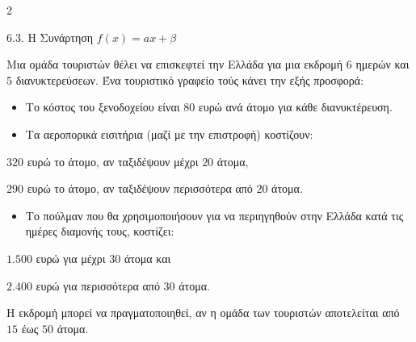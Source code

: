 \begin{ylh}{2}
    \item 6.3. Η Συνάρτηση $f(x)=ax+\beta$
\end{ylh}

Μια ομάδα τουριστών θέλει να επισκεφτεί την Ελλάδα για μια εκδρομή $6$ ημερών και $5$ διανυκτερεύσεων. Ένα τουριστικό γραφείο τούς κάνει την εξής προσφορά:

\begin{itemize}
\item
  Το κόστος του ξενοδοχείου είναι $80$ ευρώ ανά άτομο για κάθε διανυκτέρευση.
\item
  Τα αεροπορικά εισιτήρια (μαζί με την επιστροφή) κοστίζουν:
\end{itemize}

$320$ ευρώ το άτομο, αν ταξιδέψουν μέχρι $20$ άτομα,

$290$ ευρώ το άτομο, αν ταξιδέψουν περισσότερα από $20$ άτομα.

\begin{itemize}
\item
  Το πούλμαν που θα χρησιμοποιήσουν για να περιηγηθούν στην Ελλάδα κατά τις ημέρες διαμονής τους, κοστίζει:
\end{itemize}

$1.500$ ευρώ για μέχρι $30$ άτομα και

$2.400$ ευρώ για περισσότερα από $30$ άτομα.

Η εκδρομή μπορεί να πραγματοποιηθεί, αν η ομάδα των τουριστών αποτελείται από $15$ έως $50$ άτομα.

